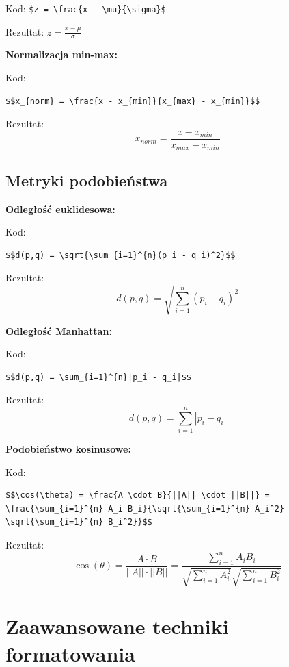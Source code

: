 \documentclass[
  polish,
  letterpaper,
  DIV=11,
  numbers=noendperiod]{scrreprt}
\begin{document}
Kod:
\texttt{\$z\ =\ \textbackslash{}frac\{x\ -\ \textbackslash{}mu\}\{\textbackslash{}sigma\}\$}

Rezultat: \(z = \frac{x - \mu}{\sigma}\)

\textbf{Normalizacja min-max:}

Kod:

\begin{verbatim}
$$x_{norm} = \frac{x - x_{min}}{x_{max} - x_{min}}$$
\end{verbatim}

Rezultat: \[x_{norm} = \frac{x - x_{min}}{x_{max} - x_{min}}\]

\subsection{Metryki podobieństwa}\label{metryki-podobieux144stwa}

\textbf{Odległość euklidesowa:}

Kod:

\begin{verbatim}
$$d(p,q) = \sqrt{\sum_{i=1}^{n}(p_i - q_i)^2}$$
\end{verbatim}

Rezultat: \[d(p,q) = \sqrt{\sum_{i=1}^{n}(p_i - q_i)^2}\]

\textbf{Odległość Manhattan:}

Kod:

\begin{verbatim}
$$d(p,q) = \sum_{i=1}^{n}|p_i - q_i|$$
\end{verbatim}

Rezultat: \[d(p,q) = \sum_{i=1}^{n}|p_i - q_i|\]

\textbf{Podobieństwo kosinusowe:}

Kod:

\begin{verbatim}
$$\cos(\theta) = \frac{A \cdot B}{||A|| \cdot ||B||} = \frac{\sum_{i=1}^{n} A_i B_i}{\sqrt{\sum_{i=1}^{n} A_i^2} \sqrt{\sum_{i=1}^{n} B_i^2}}$$
\end{verbatim}

Rezultat:
\[\cos(\theta) = \frac{A \cdot B}{||A|| \cdot ||B||} = \frac{\sum_{i=1}^{n} A_i B_i}{\sqrt{\sum_{i=1}^{n} A_i^2} \sqrt{\sum_{i=1}^{n} B_i^2}}\]

\section{Zaawansowane techniki
formatowania}\label{zaawansowane-techniki-formatowania}
\end{document}
